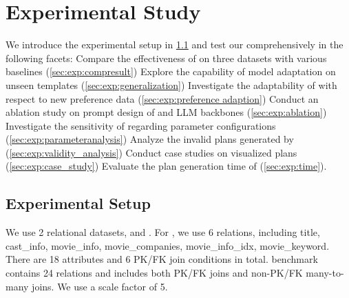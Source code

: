 \section{Experimental Study}
\label{sec:exp}

We introduce the experimental setup in \cref{sec:exp:setup} and test our \LLMQO comprehensively in the following facets: 
 Compare the effectiveness of \LLMQO on three datasets with various baselines (\cref{sec:exp:compresult}) 
 Explore the capability of model adaptation on unseen templates (\cref{sec:exp:generalization})
 Investigate the adaptability of \QDPO with respect to new preference data (\cref{sec:exp:preference adaption})
 Conduct an ablation study on prompt design of \QueryInstruct and LLM backbones (\cref{sec:exp:ablation}) 
 Investigate the sensitivity of \LLMQO regarding parameter configurations (\cref{sec:exp:parameteranalysis}) 
 Analyze the invalid plans generated by \LLMQO (\cref{sec:exp:validity_analysis})
 Conduct case studies on visualized plans (\cref{sec:exp:case_study}) 
 Evaluate the plan generation time of \LLMQO (\cref{sec:exp:time}). 

\subsection{Experimental Setup}
\label{sec:exp:setup}
We use 2 relational datasets, \imdb and \tpcds. 
For \imdb \cite{DBLP:conf/job/Leis18}, we use 6 relations, including \textsf{title}, \textsf{cast\_info}, \textsf{movie\_info}, \textsf{movie\_companies}, \textsf{movie\_info\_idx}, \textsf{movie\_keyword}.
There are 18 attributes and 6 PK/FK join conditions in total. 
\tpcds benchmark \cite{DBLP:conf/tpcds/Poess02} contains 24 relations and includes both PK/FK joins and non-PK/FK many-to-many joins. We use a scale factor of 5.


